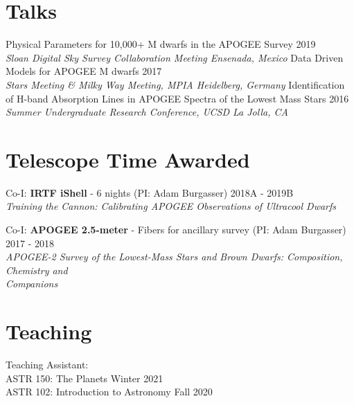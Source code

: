 \documentclass[margin,line]{resume}
\begin{document}
\begin{resume}
\section{\mysidestyle \textcolor{bcolor}{Talks}}
Physical Parameters for 10,000+ M dwarfs in the APOGEE Survey \hfill 2019 \\ 
\-\hspace{.25cm} \textit{Sloan Digital Sky Survey Collaboration Meeting \hfill Ensenada, Mexico}\vspace{.1cm} \newline
Data Driven Models for APOGEE M dwarfs \hfill 2017 \\ 
\-\hspace{.25cm} \textit{Stars Meeting  \& Milky Way Meeting, MPIA \hfill Heidelberg, Germany}\vspace{.1cm} \newline
Identification of H-band Absorption Lines in APOGEE Spectra of the Lowest Mass Stars \hfill 2016 \\ 
\-\hspace{.25cm} \textit{Summer Undergraduate Research Conference, UCSD \hfill La Jolla, CA}



\section{\mysidestyle \textcolor{bcolor}{Telescope Time Awarded}}
Co-I: \textbf{IRTF iShell} - 6 nights (PI: Adam Burgasser) \hfill 2018A - 2019B \\ 
\-\hspace{.25cm} \textit{Training the Cannon: Calibrating APOGEE Observations of Ultracool Dwarfs} 

Co-I: \textbf{APOGEE 2.5-meter} - Fibers for ancillary survey (PI: Adam Burgasser) \hfill 2017 - 2018 \\
\-\hspace{.25cm} \textit{APOGEE-2 Survey of the Lowest-Mass Stars and Brown Dwarfs: Composition, Chemistry and \\\-\hspace{.25cm}  Companions}



\section{\mysidestyle \textcolor{bcolor}{Teaching}}
Teaching Assistant: \\
\-\hspace{.25cm} ASTR 150: The Planets \hfill Winter 2021 \\
\-\hspace{.25cm} ASTR 102: Introduction to Astronomy \hfill Fall 2020 


\end{resume}
\end{document}
